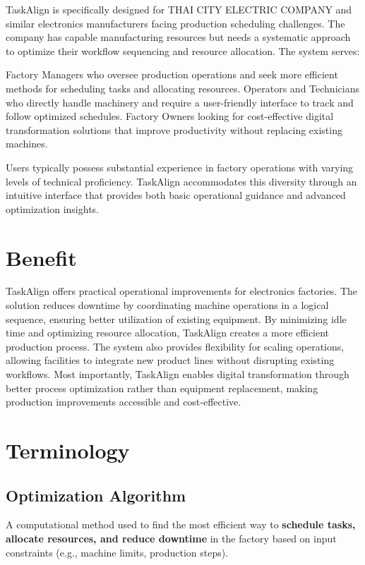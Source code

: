 TaskAlign is specifically designed for THAI CITY ELECTRIC COMPANY and similar electronics manufacturers facing production scheduling challenges. The company has capable manufacturing resources but needs a systematic approach to optimize their workflow sequencing and resource allocation.
The system serves:

Factory Managers who oversee production operations and seek more efficient methods for scheduling tasks and allocating resources.
Operators and Technicians who directly handle machinery and require a user-friendly interface to track and follow optimized schedules.
Factory Owners looking for cost-effective digital transformation solutions that improve productivity without replacing existing machines.

Users typically possess substantial experience in factory operations with varying levels of technical proficiency. TaskAlign accommodates this diversity through an intuitive interface that provides both basic operational guidance and advanced optimization insights.

\section{Benefit}
\label{section:benefit}

TaskAlign offers practical operational improvements for electronics factories. The solution reduces downtime by coordinating machine operations in a logical sequence, ensuring better utilization of existing equipment. By minimizing idle time and optimizing resource allocation, TaskAlign creates a more efficient production process. The system also provides flexibility for scaling operations, allowing facilities to integrate new product lines without disrupting existing workflows. Most importantly, TaskAlign enables digital transformation through better process optimization rather than equipment replacement, making production improvements accessible and cost-effective.

\section{Terminology}
\label{section:terminology}

\subsection{Optimization Algorithm}
A computational method used to find the most efficient way to \textbf{schedule tasks, allocate resources, and reduce downtime} in the factory based on input constraints (e.g., machine limits, production steps).  

